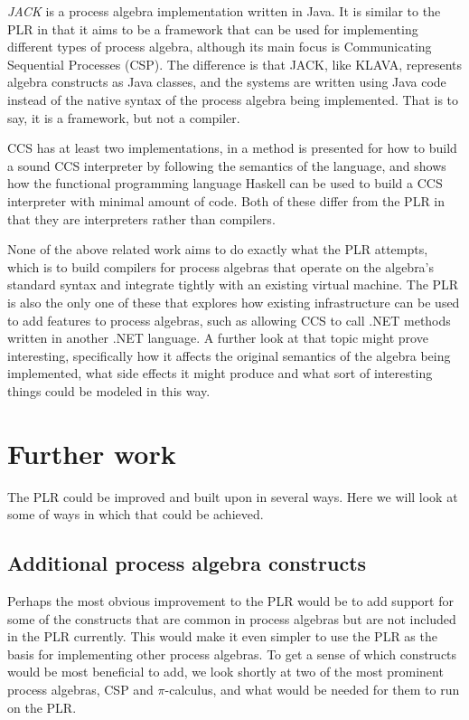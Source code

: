 	\textit{JACK} \cite{jack} is a process algebra implementation written in 
	Java. It is similar to the PLR in that it aims to be a framework that can be
	used for implementing different types of process algebra, although its main
	focus is Communicating Sequential Processes (CSP). The difference is that 
	JACK, like KLAVA, represents algebra constructs as Java classes, and the  
	systems are written using Java code instead of the native syntax of the 
	process algebra being implemented. That is to say, it is a framework, but 
	not a compiler.
	
	CCS has at least two implementations, in \cite{build_ccs_interpreter} a 
	method is presented for how to build a sound CCS interpreter by following 
	the semantics of the language, and \cite{ccs_interpreter} shows how the 
	functional programming language Haskell can be used to build a CCS 
	interpreter with minimal amount of code. Both of these differ from the PLR 
	in that they are interpreters rather than compilers.
	
	None of the above related work aims to do exactly what the PLR attempts, 
	which is to build compilers for process algebras that operate on the 		
	algebra's standard syntax and integrate tightly with an existing virtual 
	machine. The PLR is also the only one of these that explores how existing 
	infrastructure can be used to add features to process algebras, such as 
	allowing CCS to call .NET methods written in another .NET language. A 
	further look at that topic might prove interesting, specifically how it 
	affects the original semantics of the algebra being implemented, what side 
	effects it might produce and what sort of interesting things could be
	modeled in this way.

\section{Further work}

	The PLR could be improved and built upon in several ways. Here we will look 
	at some of ways in which that could be achieved.
	
	\subsection{Additional process algebra constructs}
	
	Perhaps the most obvious improvement to the PLR would be to add support for 
	some of the constructs that are common in process algebras but are not 
	included in the PLR currently. This would make it even simpler to use the 
	PLR as the basis for implementing other process algebras. To get a sense of 
	which constructs would be most beneficial to add, we look shortly at two
	of the most prominent process algebras, CSP and $\pi$-calculus, and 
	what would be needed for them to run on the PLR.
	
